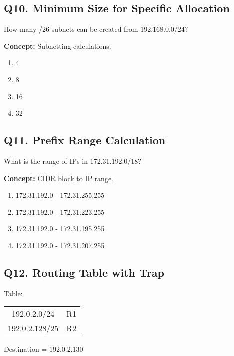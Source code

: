 
\subsection*{Q10. Minimum Size for Specific Allocation}
How many /26 subnets can be created from 192.168.0.0/24?

\textbf{Concept:} Subnetting calculations.

\begin{enumerate}[label=(\alph*)]
\item 4 \quad \item 8 \quad \item 16 \quad \item 32
\end{enumerate}


\subsection*{Q11. Prefix Range Calculation}
What is the range of IPs in 172.31.192.0/18?

\textbf{Concept:} CIDR block to IP range.

\begin{enumerate}[label=(\alph*)]
\item 172.31.192.0 - 172.31.255.255  
\item 172.31.192.0 - 172.31.223.255  
\item 172.31.192.0 - 172.31.195.255  
\item 172.31.192.0 - 172.31.207.255  
\end{enumerate}


\subsection*{Q12. Routing Table with Trap}
Table:

\begin{table}[H]
\centering
\begin{tabular}{|c|c|}
\hline
192.0.2.0/24 & R1 \\
192.0.2.128/25 & R2 \\
\hline
\end{tabular}
\end{table}

Destination = 192.0.2.130

